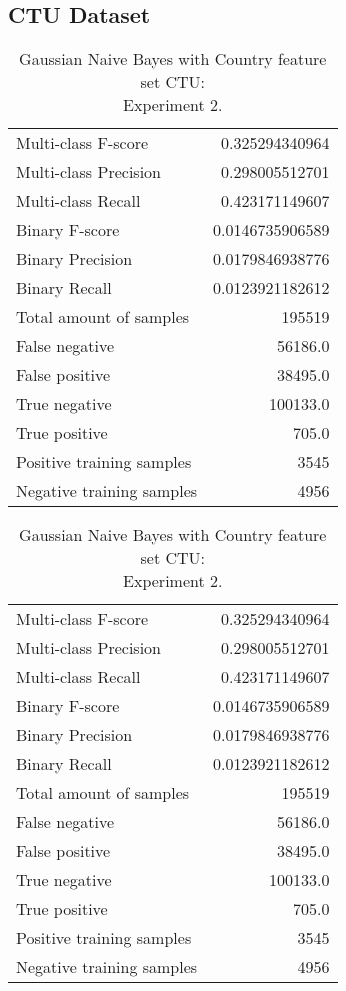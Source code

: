 \subsection{CTU Dataset}

\begin{table}[H]
\begin{minipage}{0.5\textwidth}
\caption{Gaussian Naive Bayes with Country feature set CTU: \\Experiment 1.}
\centering
\begin{tabular}{l r}
\toprule
Multi-class F-score & 0.325294340964 \\
Multi-class Precision & 0.298005512701 \\
Multi-class Recall & 0.423171149607 \\
\midrule
Binary F-score & 0.0146735906589 \\
Binary Precision & 0.0179846938776 \\
Binary Recall & 0.0123921182612 \\
\midrule
Total amount of samples & 195519 \\
False negative & 56186.0 \\
False positive & 38495.0 \\
True negative & 100133.0 \\
True positive & 705.0 \\
\midrule
Positive training samples & 3545 \\
Negative training samples & 4956 \\
\bottomrule
\end{tabular}
\end{minipage}
\hfillx
\begin{minipage}{0.5\textwidth}
\caption{Gaussian Naive Bayes with Country feature set CTU: \\Experiment 2.}
\centering
\begin{tabular}{l r}
\toprule
Multi-class F-score & 0.325294340964 \\
Multi-class Precision & 0.298005512701 \\
Multi-class Recall & 0.423171149607 \\
\midrule
Binary F-score & 0.0146735906589 \\
Binary Precision & 0.0179846938776 \\
Binary Recall & 0.0123921182612 \\
\midrule
Total amount of samples & 195519 \\
False negative & 56186.0 \\
False positive & 38495.0 \\
True negative & 100133.0 \\
True positive & 705.0 \\
\midrule
Positive training samples & 3545 \\
Negative training samples & 4956 \\
\bottomrule
\end{tabular}
\end{minipage}
\end{table}
